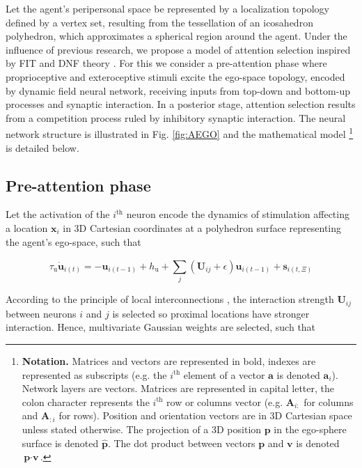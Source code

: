 \documentclass[letterpaper, 10 pt, conference]{ieeeconf}  %
\begin{document}
	Let the agent's peripersonal space be represented by a localization topology defined by a vertex set, resulting from the tessellation of an icosahedron polyhedron, which approximates a spherical region around the agent. Under the influence of previous research, we propose a model of attention selection inspired by FIT and DNF theory \cite{amari1977}. For this we consider a pre-attention phase where proprioceptive and exteroceptive stimuli excite the ego-space topology, encoded by dynamic field neural network, receiving inputs from top-down and bottom-up processes and synaptic interaction. In a posterior stage, attention selection results from a competition process ruled by inhibitory synaptic interaction. The neural network structure is illustrated in Fig. \ref{fig:AEGO} and the mathematical model \footnote{\scriptsize \textbf{Notation.} Matrices and vectors are represented in bold, indexes are represented as subscripts (e.g. the $i^{\mathrm{th}}$ element of a vector $\mathbf{a}$ is denoted $\mathbf{a}_{i}$). Network layers are vectors. Matrices are represented in capital letter, the colon character represents the $i^{\mathrm{th}}$ row or columns vector (e.g. $\mathbf{A}_{i:}$ for columns and $\mathbf{A}_{:i}$ for rows). Position and orientation vectors are in 3D Cartesian space unless stated otherwise. The projection of a 3D position $\mathbf{p}$ in the ego-sphere surface is denoted $\mathbf{\hat{p}}$. The dot product between vectors $\textbf{p}$ and $\textbf{v}$ is denoted $\textbf{p}\cdot\textbf{v}$.} is detailed below.
	
	
	\subsection{Pre-attention phase}
	Let the activation of the $i^\mathrm{th}$ neuron encode the dynamics of stimulation affecting a location  $\mathbf{x}_i$ in 3D Cartesian coordinates at a polyhedron surface representing the agent's ego-space, such that 
		
	\begin{equation}
	\tau_\mathrm{u} \dot{\mathbf{u}}_{i(t)} = -\mathbf{u}_{i(t-1)} + h_\mathrm{u} + \sum_{j}^{} (\mathbf{U}_{ij}+\epsilon)\mathbf{u}_{i(t-1)} + \mathbf{s}_{i(t,\Xi)} 
	\label{eq:pre-sel}
	\end{equation}

	According to the principle of local interconnections \cite{samsonovich97}, the interaction strength $\mathbf{U}_{ij}$ between neurons $i$ and $j$ is selected so proximal locations have stronger interaction. Hence, multivariate Gaussian weights are selected, such that
	
\end{document}
